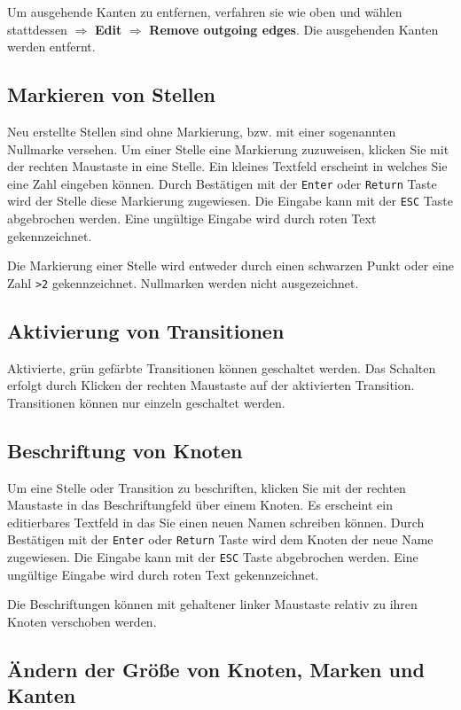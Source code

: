 \documentclass[11pt]{article}
\begin{document}
    Um ausgehende Kanten zu entfernen, verfahren sie wie oben und
    wählen stattdessen $\Rightarrow$ \textbf{Edit} $\Rightarrow$ \textbf{Remove outgoing     edges}. Die ausgehenden Kanten werden entfernt.
\subsection{Markieren von Stellen}
\label{sec-2-3}


   Neu erstellte Stellen sind ohne Markierung, bzw. mit einer
   sogenannten Nullmarke versehen. Um einer Stelle eine Markierung
   zuzuweisen, klicken Sie mit der rechten Maustaste in eine Stelle.
   Ein kleines Textfeld erscheint in welches Sie eine Zahl eingeben
   können. Durch Bestätigen mit der \verb|Enter| oder \verb|Return|
   Taste wird der Stelle diese Markierung zugewiesen. Die Eingabe kann
   mit der \verb|ESC| Taste abgebrochen werden.  Eine ungültige
   Eingabe wird durch roten Text gekennzeichnet.

   Die Markierung einer Stelle wird entweder durch einen schwarzen
   Punkt oder eine Zahl \verb|>2| gekennzeichnet. Nullmarken werden
   nicht ausgezeichnet.
\subsection{Aktivierung von Transitionen}
\label{sec-2-4}


   Aktivierte, grün gefärbte Transitionen können geschaltet werden.
   Das Schalten erfolgt durch Klicken der rechten Maustaste auf der
   aktivierten Transition.  Transitionen können nur einzeln geschaltet
   werden.
\subsection{Beschriftung von Knoten}
\label{sec-2-5}


   Um eine Stelle oder Transition zu beschriften, klicken Sie mit der
   rechten Maustaste in das Beschriftungfeld über einem Knoten. Es
   erscheint ein editierbares Textfeld in das Sie einen neuen Namen
   schreiben können. Durch Bestätigen mit der \verb|Enter| oder
   \verb|Return| Taste wird dem Knoten der neue Name zugewiesen. Die
   Eingabe kann mit der \verb|ESC| Taste abgebrochen werden.  Eine
   ungültige Eingabe wird durch roten Text gekennzeichnet.

   Die Beschriftungen können mit gehaltener linker Maustaste relativ
   zu ihren Knoten verschoben werden.
\subsection{Ändern der Größe von Knoten, Marken und Kanten}
\label{sec-2-6}
\end{document}
